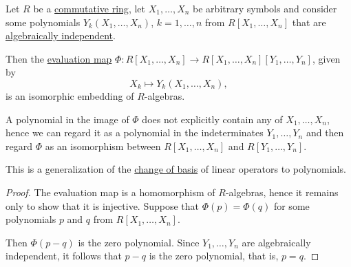 \begin{proposition}\label{thm:change_of_polynomial_basis}
  Let \( R \) be a \hyperref[def:commutative_ring]{commutative ring}, let \( X_1, \ldots, X_n \) be arbitrary symbols and consider some polynomials \( Y_k(X_1, \ldots, X_n) \), \( k = 1, \ldots, n \) from \( R[X_1, \ldots, X_n] \) that are \hyperref[def:algebraic_dependence]{algebraically independent}.

  Then the \hyperref[thm:polynomial_algebra_universal_property]{evaluation map} \( \Phi: R[X_1, \ldots, X_n] \to R[X_1, \ldots, X_n][Y_1, \ldots, Y_n] \), given by
  \begin{equation*}
    X_k \mapsto Y_k(X_1, \ldots, X_n),
  \end{equation*}
  is an isomorphic embedding of \( R \)-algebras.
\end{proposition}
\begin{comments}
  \item A polynomial in the image of \( \Phi \) does not explicitly contain any of \( X_1, \ldots, X_n \), hence we can regard it as a polynomial in the indeterminates \( Y_1, \ldots, Y_n \) and then regard \( \Phi \) as an isomorphism between \( R[X_1, \ldots, X_n] \) and \( R[Y_1, \ldots, Y_n] \).

  \item This is a generalization of the \hyperref[rem:change_of_basis]{change of basis} of linear operators to polynomials.
\end{comments}
\begin{proof}
  The evaluation map is a homomorphism of \( R \)-algebras, hence it remains only to show that it is injective. Suppose that \( \Phi(p) = \Phi(q) \) for some polynomials \( p \) and \( q \) from \( R[X_1, \ldots, X_n] \).

  Then \( \Phi(p - q) \) is the zero polynomial. Since \( Y_1, \ldots, Y_n \) are algebraically independent, it follows that \( p - q \) is the zero polynomial, that is, \( p = q \).
\end{proof}
